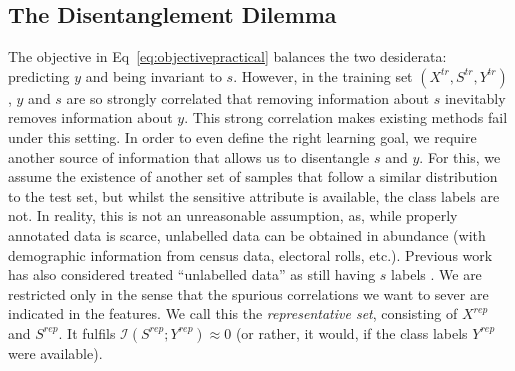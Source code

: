\subsection{The Disentanglement Dilemma} %
The objective in Eq~\eqref{eq:objectivepractical} balances the two desiderata: predicting $y$ and being invariant to $s$.
However, in the training set $(X^\mathit{tr}, S^\mathit{tr}, Y^\mathit{tr})$,
$y$ and $s$ are so strongly correlated that removing information about $s$ inevitably removes information about $y$.
This strong correlation makes existing methods fail under this setting.
In order to even define the right learning goal,
we require another source of information that allows us to disentangle $s$ and $y$.
For this, we assume the existence of another set of samples that follow a similar distribution to the test set,
but whilst the sensitive attribute is available, the class labels are not.
In reality, this is not an unreasonable assumption,
as, while properly annotated data is scarce, unlabelled data can be obtained in abundance (with demographic information from census data, electoral rolls, etc.).
Previous work has also considered treated ``unlabelled data'' as still having $s$ labels \cite{wick2019unlocking}.
We are restricted only in the sense that the spurious correlations we want to sever are indicated in the features.
We call this the \emph{representative set}, consisting of $X^\mathit{rep}$ and $S^\mathit{rep}$.
It fulfils $\mathcal{I}(S^\mathit{rep}; Y^\mathit{rep}) \approx 0$
(or rather, it would, if the class labels $Y^\mathit{rep}$ were available).

